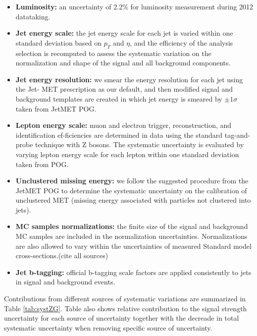 \begin{itemize}
        \item{\textbf{Luminosity:}}
        an uncertainty of 2.2\% for luminosity measurement during 2012 datataking.
        \item{\textbf{Jet energy scale:}}
        the jet energy scale for each jet is varied within one standard deviation based on $p_T$ and $\eta$, and the efficiency of the analysis selection is recomputed to assess the systematic variation on the normalization and shape of the signal and all background components.
        \item{\textbf{Jet energy resolution:}}
        we smear the energy resolution for each jet using the Jet- MET prescription as our default, and then modified signal and background templates are created in which jet energy is smeared by $\pm 1 \sigma$ taken from JetMET POG.
        \item{\textbf{Lepton energy scale:}}
        muon and electron trigger, reconstruction, and identification ef-ficiencies are determined in data using the standard tag-and-probe technique with Z bosons. The systematic uncertainty is evaluated by varying lepton energy scale for each lepton within one standard deviation taken from POG.
        \item{\textbf{Unclustered missing energy:}}
        we follow the suggested procedure from the JetMET POG to determine the systematic uncertainty on the calibration of unclustered MET (missing energy associated with particles not clustered into jets).
        \item{\textbf{MC samples normalizations:}}
        the finite size of the signal and background MC samples are included in the normalization uncertainties. Normalizations are also allowed to vary within the uncertainties of measured Standard model cross-sections.(cite all sources)
        \item{\textbf{Jet b-tagging:}}
        official b-tagging scale factors are applied consistently to jets in signal and background events.
\end{itemize}

Contributions from different sources of systematic variations are summarized in Table \ref{tab:systZG}. Table also shows relative contribution to the signal strength uncertainty for each source of uncertainty together with the decreade in total systematic uncertainty when removing specific source of uncertainty.

